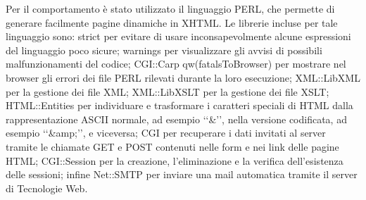 {	Per il comportamento è stato utilizzato il linguaggio PERL, che permette di generare facilmente pagine dinamiche in XHTML. Le librerie incluse per tale linguaggio sono: strict per evitare di usare inconsapevolmente alcune espressioni del linguaggio poco sicure; warnings per visualizzare gli avvisi di possibili malfunzionamenti del codice; CGI::Carp qw(fatalsToBrowser) per mostrare nel browser gli errori dei file PERL rilevati durante la loro esecuzione; XML::LibXML per la gestione dei file XML; XML::LibXSLT per la gestione dei file XSLT; HTML::Entities per individuare e trasformare i caratteri speciali di HTML dalla rappresentazione ASCII normale, ad esempio ‘‘\&’’, nella versione codificata, ad esempio ‘‘\&amp;’’, e viceversa; CGI per recuperare i dati invitati al server tramite le chiamate GET e POST contenuti nelle form e nei link delle pagine HTML; CGI::Session per la creazione, l'eliminazione e la verifica dell'esistenza delle sessioni; infine Net::SMTP per inviare una mail automatica tramite il server di Tecnologie Web.
}